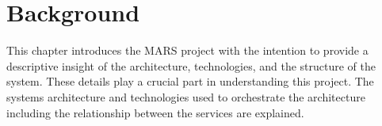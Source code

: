 \newpage
\chapter{Background}
	
This chapter introduces the MARS project with the intention to provide a descriptive insight
of the architecture, technologies, and the structure of the system. These details play a crucial part in understanding this project. 
The systems architecture and technologies used to orchestrate the architecture including the 
relationship between the services are explained.

	
	
	
	